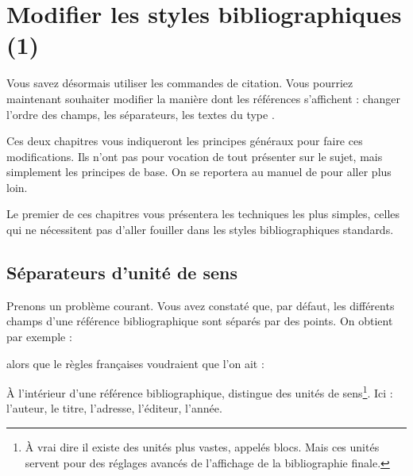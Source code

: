 \chapter{Modifier les styles bibliographiques (1)}\label{style1}

    \begin{prealable}
    
    Vous savez désormais utiliser les commandes de citation. Vous pourriez maintenant souhaiter modifier la manière dont les références s'affichent :  changer l'ordre des champs, les séparateurs, les textes du type .
    
    Ces deux chapitres vous indiqueront les principes généraux pour faire ces modifications. Ils n'ont pas pour vocation de tout présenter sur le sujet, mais simplement les principes de base. On se reportera au manuel de  pour aller plus loin.
    
    Le premier de ces chapitres vous présentera les techniques les plus simples, celles qui ne nécessitent pas d'aller fouiller dans les styles bibliographiques standards. 
    
    
    \end{prealable}
    
    
\section{Séparateurs d'unité de sens}\label{unitebiblio}
    
Prenons un problème courant. Vous avez constaté que, par défaut, les différents champs d'une référence bibliographique sont séparés par des points. On obtient par exemple :
    
    \bibverbose

    
    \renewcommand{\newunitpunct}[0]{\adddot\addspace} %
    
    \begin{quotation}
    \cite{Urner1952}
    \end{quotation}
    
alors que le règles françaises voudraient que l'on ait :
    
\renewcommand{\newunitpunct}[0]{\addcomma\addspace} %
    
    \begin{quotation}
    \cite{Urner1952}
    \end{quotation}
    
    \bibverbosetrad

À l'intérieur d'une référence bibliographique,  distingue des unités de sens\footnote{À vrai dire il existe des unités plus vastes, appelés blocs. Mais ces unités servent pour des réglages avancés de l'affichage de la bibliographie finale.}. Ici : l'auteur, le titre, l'adresse, l'éditeur, l'année. 

